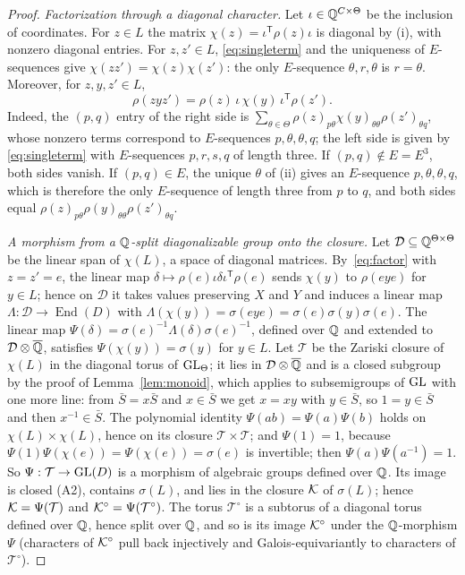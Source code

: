 \begin{proof}
\emph{Factorization through a diagonal character.} Let $\iota\in\mathbb{Q}^{C\times\Theta}$ be the inclusion of
coordinates. For $z\in L$ the matrix $\chi(z)=\iota^{\mathsf T}\rho(z)\iota$ is diagonal by (i), with
nonzero diagonal entries. For $z,z'\in L$, \eqref{eq:singleterm} and the uniqueness of
$E$-sequences give $\chi(zz')=\chi(z)\chi(z')$: the only $E$-sequence $\theta,r,\theta$ is $r=\theta$. Moreover, for
$z,y,z'\in L$,
\begin{equation}\label{eq:factor}
\rho(zyz')=\rho(z)\,\iota\,\chi(y)\,\iota^{\mathsf T}\rho(z').
\end{equation}
Indeed, the $(p,q)$ entry of the right side is $\sum_{\theta\in\Theta}\rho(z)_{p\theta}\chi(y)_{\theta\theta}\rho(z')_{\theta q}$,
whose nonzero terms correspond to $E$-sequences $p,\theta,\theta,q$; the left side is given by
\eqref{eq:singleterm} with $E$-sequences $p,r,s,q$ of length three. If $(p,q)\notin E=E^3$, both sides
vanish. If $(p,q)\in E$, the unique $\theta$ of (ii) gives an $E$-sequence $p,\theta,\theta,q$, which is therefore
the only $E$-sequence of length three from $p$ to $q$, and both sides equal
$\rho(z)_{p\theta}\rho(y)_{\theta\theta}\rho(z')_{\theta q}$.

\emph{A morphism from a $\mathbb{Q}$-split diagonalizable group onto the closure.} Let $\mathcal D\subseteq\mathbb{Q}^{\Theta\times\Theta}$ be
the linear span of $\chi(L)$, a space of diagonal matrices. By~\eqref{eq:factor} with $z=z'=e$, the
linear map $\delta\mapsto\rho(e)\iota\delta\iota^{\mathsf T}\rho(e)$ sends $\chi(y)$ to $\rho(eye)$ for
$y\in L$; hence on $\mathcal D$ it takes values preserving $X$ and $Y$ and induces a linear map
$\Lambda:\mathcal D\to\operatorname{End}(D)$ with $\Lambda(\chi(y))=\sigma(eye)=\sigma(e)\sigma(y)\sigma(e)$.
The linear map $\Psi(\delta)=\sigma(e)^{-1}\Lambda(\delta)\sigma(e)^{-1}$, defined over $\mathbb{Q}$ and
extended to $\mathcal D\otimes\overline{\mathbb{Q}}$, satisfies $\Psi(\chi(y))=\sigma(y)$ for $y\in L$. Let $\mathcal T$
be the Zariski closure of $\chi(L)$ in the diagonal torus of $\mathrm{GL}_{\Theta}$; it lies in
$\mathcal D\otimes\overline{\mathbb{Q}}$ and is a closed subgroup by the proof of Lemma~\ref{lem:monoid}, which applies to
subsemigroups of $\mathrm{GL}$ with one more line: from $\bar S=x\bar S$ and $x\in\bar S$ we get $x=xy$ with
$y\in\bar S$, so $1=y\in\bar S$ and then $x^{-1}\in\bar S$. The polynomial identity $\Psi(ab)=\Psi(a)\Psi(b)$ holds on
$\chi(L)\times\chi(L)$, hence on its closure $\mathcal T\times\mathcal T$; and $\Psi(1)=1$, because
$\Psi(1)\Psi(\chi(e))=\Psi(\chi(e))=\sigma(e)$ is invertible; then $\Psi(a)\Psi(a^{-1})=1$. So $\Psi:\mathcal T\to\mathrm{GL}(D)$ is a
morphism of algebraic groups defined over $\mathbb{Q}$. Its image is closed (A2), contains $\sigma(L)$, and
lies in the closure $\mathcal{K}$ of $\sigma(L)$; hence $\mathcal{K}=\Psi(\mathcal T)$ and $\mathcal{K}^\circ=\Psi(\mathcal T^\circ)$.
The torus $\mathcal T^\circ$ is a subtorus of a diagonal torus defined over $\mathbb{Q}$, hence split over $\mathbb{Q}$,
and so is its image $\mathcal{K}^\circ$ under the $\mathbb{Q}$-morphism $\Psi$ (characters of $\mathcal{K}^\circ$ pull back
injectively and Galois-equivariantly to characters of $\mathcal T^\circ$).


\end{proof}
